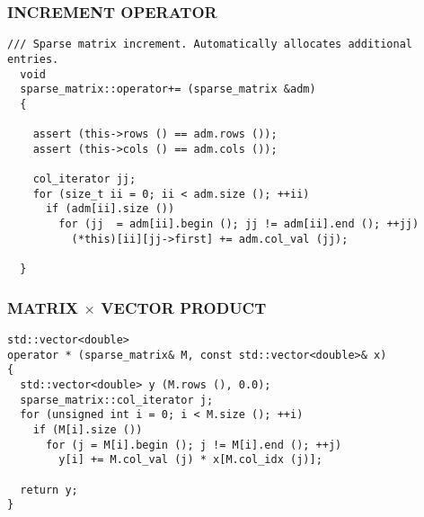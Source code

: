 \documentclass{beamer}
\begin{document}
\begin{frame}[fragile]
\frametitle{INCREMENT OPERATOR}\tiny
\begin{lstlisting}
/// Sparse matrix increment. Automatically allocates additional entries.
  void 
  sparse_matrix::operator+= (sparse_matrix &adm)
  {
  
    assert (this->rows () == adm.rows ());
    assert (this->cols () == adm.cols ());

    col_iterator jj;
    for (size_t ii = 0; ii < adm.size (); ++ii)
      if (adm[ii].size ())
        for (jj  = adm[ii].begin (); jj != adm[ii].end (); ++jj)
          (*this)[ii][jj->first] += adm.col_val (jj);
  
  }
\end{lstlisting}
\end{frame}

\begin{frame}[fragile]
\frametitle{MATRIX $\times$ VECTOR PRODUCT}\tiny
\begin{lstlisting}
std::vector<double>
operator * (sparse_matrix& M, const std::vector<double>& x)
{
  std::vector<double> y (M.rows (), 0.0);
  sparse_matrix::col_iterator j;
  for (unsigned int i = 0; i < M.size (); ++i)
    if (M[i].size ())
      for (j = M[i].begin (); j != M[i].end (); ++j)
        y[i] += M.col_val (j) * x[M.col_idx (j)];

  return y;
}
\end{lstlisting}
\end{frame}

  
\end{document}
